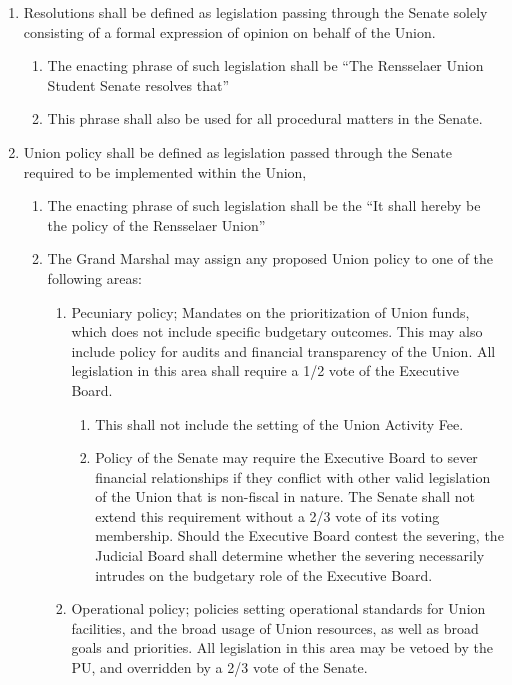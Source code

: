 \begin{enumerate}
\begin{enumerate}
  \item The Student Senate Bylaws may be temporarily suspended by a 2/3 vote. This suspension will stand until any of the following occur: The meeting in which the Bylaws were temporarily suspended adjourned, or the Senate reinstates these Bylaws by majority vote.
  \end{enumerate}
\item Resolutions shall be defined as legislation passing through the Senate solely consisting of a formal expression of opinion on behalf of the Union.
  \begin{enumerate}
  \item The enacting phrase of such legislation shall be ``The Rensselaer Union Student Senate resolves that''
  \item This phrase shall also be used for all procedural matters in the Senate.
  \end{enumerate}
\item Union policy shall be defined as legislation passed through the Senate required to be implemented within the Union,
  \begin{enumerate}
  \item The enacting phrase of such legislation shall be the ``It shall hereby be the policy of the Rensselaer Union''
  \item The Grand Marshal may assign any proposed Union policy to one of the following areas:
    \begin{enumerate}
    \item Pecuniary policy; Mandates on the prioritization of Union funds, which does not include specific budgetary outcomes. This may also include policy for audits and financial transparency of the Union. All legislation in this area shall require a 1/2 vote of the Executive Board.
      \begin{enumerate}
      \item This shall not include the setting of the Union Activity Fee.
      \item Policy of the Senate may require the Executive Board to sever financial relationships if they conflict with other valid legislation of the Union that is non-fiscal in nature. The Senate shall not extend this requirement without a 2/3 vote of its voting membership. Should the Executive Board contest the severing, the Judicial Board shall determine whether the severing necessarily intrudes on the budgetary role of the Executive Board.
      \end{enumerate}
    \item Operational policy; policies setting operational standards for Union facilities, and the broad usage of Union resources, as well as broad goals and priorities. All legislation in this area may be vetoed by the PU, and overridden by a 2/3 vote of the Senate.

\end{enumerate}
\end{enumerate}
\end{enumerate}
